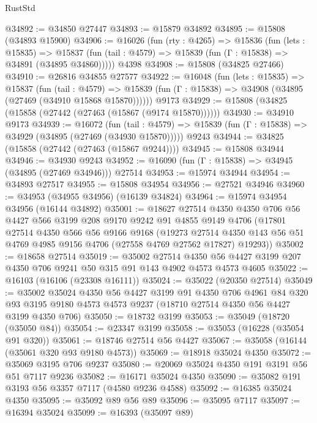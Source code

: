 \begin{lexlean}{RustStd}
\begin{coremodule}
@34892 := @34850 @27447
@34893 := @15879 @34892
@34895 := @15808 (@34893 @15900)
@34906 := @16026
    (fun (rty : @4265) =>
    @15836
      (fun (lets : @15835) =>
      @15837 (fun (tail : @4579) => @15839 (fun (Γ : @15838) => @34891 (@34895 @34860)))))
    @4398
@34908 := @15808 (@34825 @27466)
@34910 := @26816 @34855 @27577
@34922 := @16048
    (fun (lets : @15835) =>
    @15837
      (fun (tail : @4579) =>
      @15839 (fun (Γ : @15838) => @34908 (@34895 (@27469 (@34910 @15868 @15870))))))
    @9173
@34929 := @15808 (@34825 (@15858 (@27442 (@27463 (@15867 (@9174 @15870))))))
@34930 := @34910 @9173
@34939 := @16072
    (fun (tail : @4579) => @15839 (fun (Γ : @15838) => @34929 (@34895 (@27469 (@34930 @15870)))))
    @9243
@34944 := @34825 (@15858 (@27442 (@27463 (@15867 @9244))))
@34945 := @15808 @34944
@34946 := @34930 @9243
@34952 := @16090 (fun (Γ : @15838) => @34945 (@34895 (@27469 @34946))) @27514
@34953 := @15974 @34944
@34954 := @34893 @27517
@34955 := @15808 @34954
@34956 := @27521 @34946
@34960 := @34953 (@34955 @34956) (@16139 @34824)
@34964 := @15974 @34954 @34956 (@16144 @34892)
@35001 := @18627
    @27514
    @4350
    @4350
    @706
    @56
    @4427
    @566
    @3199
    @208
    @9170
    @9242
    @91
    @4855
    @9149
    @4706
    (@17801
      @27514
      @4350
      @566
      @56
      @9166
      @9168
      (@19273
        @27514
        @4350
        @143
        @56
        @51
        @4769
        @4985
        @9156
        @4706
        (@27558 @4769 @27562 @17827)
        @19293))
@35002 := @18658 @27514
@35019 := @35002
    @27514
    @4350
    @56
    @4427
    @3199
    @207
    @4350
    @706
    @9241
    @50
    @315
    @91
    @143
    @4902
    @4573
    @4573
    @4605
@35022 := @16103 (@16106 (@23308 @16111))
@35024 := @35022 (@20350 @27514)
@35049 := @35002
    @35024
    @4350
    @56
    @4427
    @3199
    @91
    @4350
    @706
    @4961
    @84
    @320
    @93
    @3195
    @9180
    @4573
    @4573
    @9237
    (@18710 @27514 @4350 @56 @4427 @3199 @4350 @706)
@35050 := @18732 @3199
@35053 := @35049 (@18720 (@35050 @84))
@35054 := @23347 @3199
@35058 := @35053 (@16228 (@35054 @91 @320))
@35061 := @18746 @27514 @56 @4427
@35067 := @35058 (@16144 (@35061 @320 @93 @9180 @4573))
@35069 := @18918 @35024 @4350
@35072 := @35069 @3195 @706 @9237
@35080 := @20069 @35024 @4350 @191 @3191 @56 @51 @7117 @9236
@35082 := @16171 @35024 @4350
@35090 := @35082 @191 @3193 @56 @3357 @7117 (@4580 @9236 @4588)
@35092 := @16385 @35024 @4350
@35095 := @35092 @89 @56 @89
@35096 := @35095 @7117
@35097 := @16394 @35024
@35099 := @16393 (@35097 @89)

\end{coremodule}
\end{lexlean}
